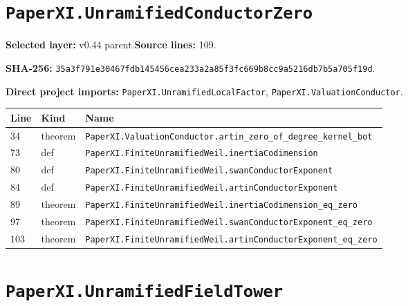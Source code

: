 \documentclass[10pt,oneside]{book}
\begin{document}
\section{\texorpdfstring{\nolinkurl{PaperXI.UnramifiedConductorZero}}{PaperXI.UnramifiedConductorZero}}\label{module:PaperXI.UnramifiedConductorZero}

\textbf{Selected layer:} v0.44 parent.\quad\textbf{Source lines:} 109.\par\textbf{SHA-256:} {\scriptsize\nolinkurl{35a3f791e30467fdb145456cea233a2a85f3fc669b8cc9a5216db7b5a705f19d}}.


\textbf{Direct project imports:} \nolinkurl{PaperXI.UnramifiedLocalFactor}, \nolinkurl{PaperXI.ValuationConductor}.

\begin{longtable}{@{}p{}p{}p{}@{}}\toprule Line&Kind&Name\\\midrule\endhead

34&theorem&\nolinkurl{PaperXI.ValuationConductor.artin_zero_of_degree_kernel_bot}\\

73&def&\nolinkurl{PaperXI.FiniteUnramifiedWeil.inertiaCodimension}\\

80&def&\nolinkurl{PaperXI.FiniteUnramifiedWeil.swanConductorExponent}\\

84&def&\nolinkurl{PaperXI.FiniteUnramifiedWeil.artinConductorExponent}\\

89&theorem&\nolinkurl{PaperXI.FiniteUnramifiedWeil.inertiaCodimension_eq_zero}\\

97&theorem&\nolinkurl{PaperXI.FiniteUnramifiedWeil.swanConductorExponent_eq_zero}\\

103&theorem&\nolinkurl{PaperXI.FiniteUnramifiedWeil.artinConductorExponent_eq_zero}\\

\bottomrule\end{longtable}

\section{\texorpdfstring{\nolinkurl{PaperXI.UnramifiedFieldTower}}{PaperXI.UnramifiedFieldTower}}\label{module:PaperXI.UnramifiedFieldTower}
\end{document}
